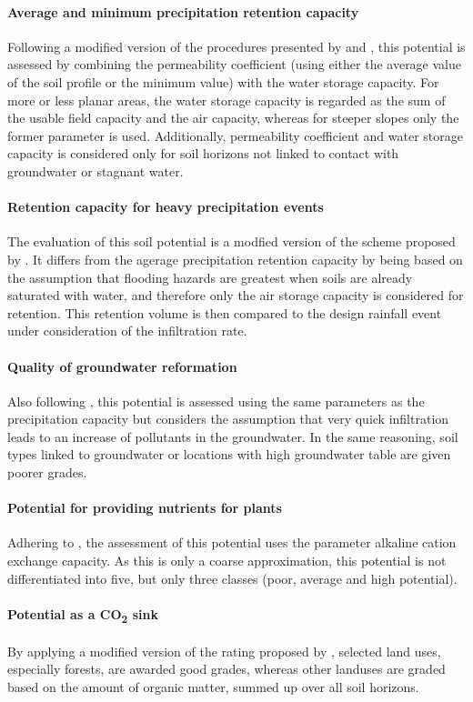 \documentclass[preprint,12pt,authoryear]{elsarticle}
\begin{document}
\paragraph{Average and minimum precipitation retention capacity}
Following a modified version of the procedures presented by \cite{LUBW1995} and \cite{BAYGLA2003}, this potential is assessed by combining the permeability coefficient (using either the average value of the soil profile or the minimum value) with the water storage capacity. For more or less planar areas, the water storage capacity is regarded as  the sum of the usable field capacity and the air capacity, whereas for steeper slopes only the former parameter is used. Additionally, permeability coefficient and water storage capacity is considered only for soil horizons not linked to contact with groundwater or stagnant water.
\paragraph{Retention capacity for heavy precipitation events}
 The evaluation of this soil potential is a modfied version of the scheme proposed by \citep{Lehmann2008}. It differs from the agerage precipitation retention capacity by being based on the assumption that flooding hazards are greatest when soils are already saturated with water, and therefore only the air storage capacity is considered for retention. This retention volume is then compared to the design rainfall event under consideration of the infiltration rate.
\paragraph{Quality of groundwater reformation}
Also following \citep{Lehmann2008}, this potential is assessed using the same parameters as the precipitation capacity but considers the assumption that very quick infiltration leads to an increase of pollutants in the groundwater. In the same reasoning, soil types linked to groundwater or locations with high groundwater table are given poorer grades.
\paragraph{Potential for providing nutrients for plants}
Adhering to \citep{Mueller2011}, the assessment of this potential uses the parameter alkaline cation exchange capacity. As this is only a coarse approximation, this potential is not differentiated into five, but only three classes (poor, average and high potential).
\paragraph{Potential as a CO\textsubscript{2} sink}
By applying a modified version of the rating proposed by \cite{Gerstenberg2005}, selected land uses, especially forests, are awarded good grades, whereas other landuses are graded based on the amount of organic matter, summed up over all soil horizons.
\end{document}
